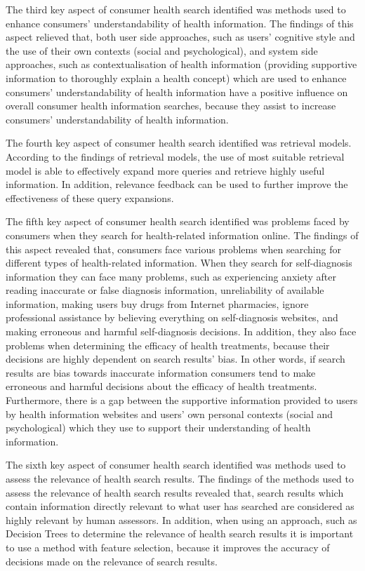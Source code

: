 \documentclass[]{article}
\begin{document}
The third key aspect of consumer health search identified was methods used to enhance consumers' understandability of health information. The findings of this aspect relieved that, both user side approaches, such as users’ cognitive style and the use of their own contexts (social and psychological), and system side approaches, such as contextualisation of health information (providing supportive information to thoroughly explain a health concept) which are used to enhance consumers’ understandability of health information have a positive influence on overall consumer health information searches, because they assist to increase consumers’ understandability of health information.

The fourth key aspect of consumer health search identified was retrieval models. According to the findings of retrieval models, the use of most suitable retrieval model is able to effectively expand more queries and retrieve highly useful information. In addition, relevance feedback can be used to further improve the effectiveness of these query expansions.

The fifth key aspect of consumer health search identified was problems faced by consumers when they search for health-related information online. The findings of this aspect revealed that, consumers face various problems when searching for different types of health-related information. When they search for self-diagnosis information they can face many problems, such as experiencing anxiety after reading inaccurate or false diagnosis information, unreliability of available information, making users buy drugs from Internet pharmacies, ignore professional assistance by believing everything on self-diagnosis websites, and making erroneous and harmful self-diagnosis decisions. In addition, they also face problems when determining the efficacy of health treatments, because their decisions are highly dependent on search results' bias. In other words, if search results are bias towards inaccurate information consumers tend to make erroneous and harmful decisions about the efficacy of health treatments. Furthermore, there is a gap between the supportive information provided to users by health information websites and users' own personal contexts (social and psychological) which they use to support their understanding of health information.  

The sixth key aspect of consumer health search identified was methods used to assess the relevance of health search results. The findings of the methods used to assess the relevance of health search results revealed that, search results which contain information directly relevant to what user has searched are considered as highly relevant by human assessors. In addition, when using an approach, such as Decision Trees to determine the relevance of health search results it is important to use a method with feature selection, because it improves the accuracy of decisions made on the relevance of search results.
\end{document}

